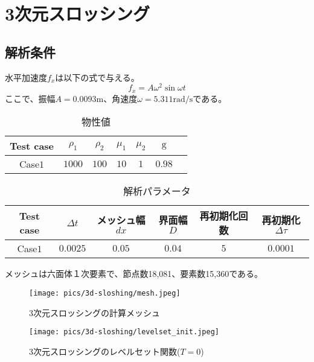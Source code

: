 \newpage
\section{3次元スロッシング}

\subsection{解析条件}

水平加速度$f_{x}$は以下の式で与える。
\begin{equation}
	f_{x} = A \omega^2 \sin{\omega t}
\end{equation}
ここで、振幅$A=0.0093 \mathrm{m}$、角速度$\omega = 5.311 \mathrm{rad/s}$である。

\renewcommand{\arraystretch}{1}
\begin{table}[H]
	\centering
	\caption{物性値}
	\begin{tabular}{ccccccc}
		\hline
		Test case & $\rho_1$ & $\rho_2$ & $\mu_1$ & $\mu_2$ & $\mathrm{g}$ \\
		\hline 
		Case$1$ & $1000$ & $100$ & $10$ & $1$   & $0.98$ \\
		\hline         
	\end{tabular}
	\label{table:3d-bubble-material-property}
\end{table}
\renewcommand{\arraystretch}{1.0}

\renewcommand{\arraystretch}{1}
\begin{table}[H]
	\centering
	\caption{解析パラメータ}
	\begin{tabular}{cccccc}
		\hline
		Test case & $\Delta t$ & メッシュ幅$dx$ & 界面幅$D$ & 再初期化回数 & 再初期化$\Delta \tau$\\
		\hline 
		Case$1$ & $0.0025$ & $0.05$ & $0.04$ & $5$ & $0.0001$\\
		\hline         
	\end{tabular}
	\label{table:3d-bubble-parameter}
\end{table}
\renewcommand{\arraystretch}{1.0}

メッシュは六面体１次要素で、節点数18,081、要素数15,360である。

\begin{figure}[H]
	\centering
	\begin{minipage}[b]{0.49\columnwidth}
	    \centering
	    \texttt{[image: pics/3d-sloshing/mesh.jpeg]}
		\caption{3次元スロッシングの計算メッシュ}
		\label{fig:3d-sloshing-mesh}
	\end{minipage}
	\begin{minipage}[b]{0.49\columnwidth}
	    \centering
	    \texttt{[image: pics/3d-sloshing/levelset\_init.jpeg]}
		\caption{3次元スロッシングのレベルセット関数($T=0$)}
		\label{fig:3d-sloshing-levelset_t0_3d}
	\end{minipage}
\end{figure}

